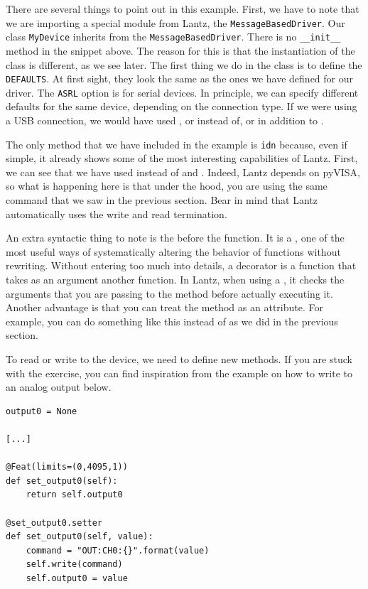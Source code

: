 There are several things to point out in this example. First, we have to note that we are importing a special module from Lantz, the \texttt{MessageBasedDriver}. Our class \texttt{MyDevice} inherits from the \texttt{MessageBasedDriver}. There is no \texttt{__init__} method in the snippet above. The reason for this is that the instantiation of the class is different, as we see later. The first thing we do in the class is to define the \texttt{DEFAULTS}. At first sight, they look the same as the ones we have defined for our driver. The \texttt{ASRL} option is for serial devices. In principle, we can specify different defaults for the same device, depending on the connection type. If we were using a {USB} connection, we would have used , or  instead of, or in addition to .

The only method that we have included in the example is \texttt{idn} because, even if simple, it already shows some of the most interesting capabilities of Lantz. First, we can see that we have used  instead of  and . Indeed, Lantz depends on pyVISA, so what is happening here is that under the hood, you are using the same command that we saw in the previous section. Bear in mind that Lantz automatically uses the write and read termination.

An extra syntactic thing to note is the  before the function. It is a , one of the most useful ways of systematically altering the behavior of functions without rewriting. Without entering too much into details, a decorator is a function that takes as an argument another function. In Lantz, when using a , it checks the arguments that you are passing to the method before actually executing it. Another advantage is that you can treat the method as an attribute. For example, you can do something like this  instead of  as we did in the previous section.


To read or write to the device, we need to define new methods. If you are stuck with the exercise, you can find inspiration from the example on how to write to an analog output below.

\begin{verbatim}
output0 = None

[...]

@Feat(limits=(0,4095,1))
def set_output0(self):
    return self.output0

@set_output0.setter
def set_output0(self, value):
    command = "OUT:CH0:{}".format(value)
    self.write(command)
    self.output0 = value
\end{verbatim}

